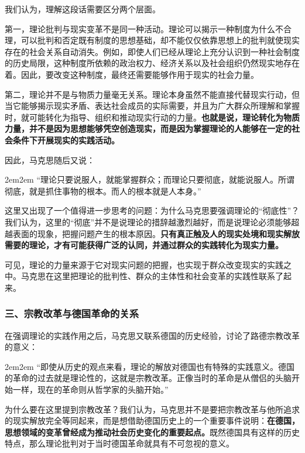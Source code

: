 \documentclass[a4paper,twoside,12pt,AutoFakeBold]{ctexart}
\begin{document}
我们认为，理解这段话需要区分两个层面。

第一，理论批判与现实变革不是同一种活动。理论可以揭示一种制度为什么不合理，可以批判和否定既有制度的思想基础，却不能仅仅依靠思想上的批判就使现实存在的社会关系自动消失。例如，即使人们已经从理论上充分认识到一种社会制度的历史局限，这种制度所依赖的政治权力、经济关系以及社会组织仍然现实地存在着。因此，要改变这种制度，最终还需要能够作用于现实的社会力量。

第二，理论并不是与物质力量毫无关系。理论本身虽然不能直接代替现实行动，但当它能够揭示现实矛盾、表达社会成员的实际需要，并且为广大群众所理解和掌握时，就可能转化为指导、组织和推动现实行动的力量。\textbf{也就是说，理论转化为物质力量，并不是因为思想能够凭空创造现实，而是因为掌握理论的人能够在一定的社会条件下开展现实的实践活动。}

因此，马克思随后又说：

\begin{adjustwidth}{2em}{2em}
\qquad\fangsong
“理论只要说服人，就能掌握群众；而理论只要彻底，就能说服人。所谓彻底，就是抓住事物的根本。而人的根本就是人本身。”
\end{adjustwidth}

这里又出现了一个值得进一步思考的问题：为什么马克思要强调理论的“彻底性”？我们认为，这里的“彻底”并不是说理论的措辞越激烈越好，而是说理论必须能够超越表面的现象，把握问题产生的根本原因。\textbf{只有真正触及人的现实处境和现实解放需要的理论，才有可能获得广泛的认同，并通过群众的实践转化为现实力量。}

可见，理论的力量来源于它对现实问题的把握，也实现于群众改变现实的实践之中。马克思在这里把理论的批判性、群众的主体性和社会变革的实践性联系了起来。

\subsubsection{三、宗教改革与德国革命的关系}

在强调理论的实践作用之后，马克思又联系德国的历史经验，讨论了路德宗教改革的意义：

\begin{adjustwidth}{2em}{2em}
\qquad\fangsong
“即使从历史的观点来看，理论的解放对德国也有特殊的实践意义。德国的革命的过去就是理论性的，这就是宗教改革。正像当时的革命是从僧侣的头脑开始一样，现在的革命则从哲学家的头脑开始。”
\end{adjustwidth}

为什么要在这里提到宗教改革？我们认为，马克思并不是要把宗教改革与他所追求的现实解放完全等同起来，而是想借助德国历史上的一个重要事件说明：\textbf{在德国，思想领域的变革曾经成为推动社会历史变化的重要起点。}既然德国具有这样的历史特点，那么理论批判对于当时德国革命就具有不可忽视的意义。
\end{document}
